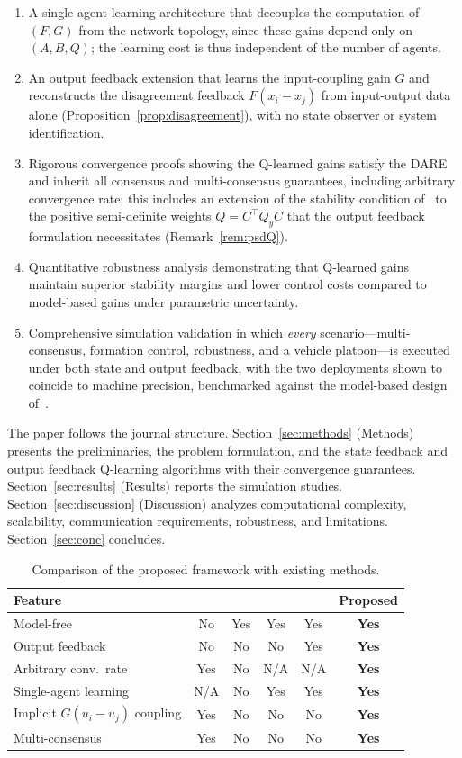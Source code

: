 \documentclass[12pt]{elsarticle}
\theoremstyle{remark}
\begin{document}
\begin{enumerate}
    \item[(i)] A single-agent learning architecture that decouples the computation of $(F,G)$ from the network topology, since these gains depend only on $(A,B,Q)$; the learning cost is thus independent of the number of agents.
    \item[(ii)] An output feedback extension that learns the input-coupling gain $G$ and reconstructs the disagreement feedback $F(x_i-x_j)$ from input-output data alone (Proposition~\ref{prop:disagreement}), with no state observer or system identification.
    \item[(iii)] Rigorous convergence proofs showing the Q-learned gains satisfy the DARE and inherit all consensus and multi-consensus guarantees, including arbitrary convergence rate; this includes an extension of the stability condition of~\cite{cacace2024} to the positive semi-definite weights $Q = C^\top Q_y C$ that the output feedback formulation necessitates (Remark~\ref{rem:psdQ}).
    \item[(iv)] Quantitative robustness analysis demonstrating that Q-learned gains maintain superior stability margins and lower control costs compared to model-based gains under parametric uncertainty.
    \item[(v)] Comprehensive simulation validation in which \emph{every} scenario---multi-consensus, formation control, robustness, and a vehicle platoon---is executed under both state and output feedback, with the two deployments shown to coincide to machine precision, benchmarked against the model-based design of~\cite{cacace2024}.
\end{enumerate}
The paper follows the journal structure. Section~\ref{sec:methods} (Methods) presents the preliminaries, the problem formulation, and the state feedback and output feedback Q-learning algorithms with their convergence guarantees. Section~\ref{sec:results} (Results) reports the simulation studies. Section~\ref{sec:discussion} (Discussion) analyzes computational complexity, scalability, communication requirements, robustness, and limitations. Section~\ref{sec:conc} concludes.
\begin{table}[htbp]
\centering
\caption{Comparison of the proposed framework with existing methods.}
\label{tab:comparison}
\small
\setlength{\tabcolsep}{4.5pt}
\begin{tabular}{lccccc}
\toprule
Feature & \cite{cacace2024} & \cite{zhang2011} & \cite{bradtke1994} & \cite{rizvi2022} & \textbf{Proposed} \\
\midrule
Model-free & No & Yes & Yes & Yes & \textbf{Yes} \\
Output feedback & No & No & No & Yes & \textbf{Yes} \\
Arbitrary conv.\ rate & Yes & No & N/A & N/A & \textbf{Yes} \\
Single-agent learning & N/A & No & Yes & Yes & \textbf{Yes} \\
Implicit $G(u_i{-}u_j)$ coupling & Yes & No & No & No & \textbf{Yes} \\
Multi-consensus & Yes & No & No & No & \textbf{Yes} \\
\bottomrule
\end{tabular}
\end{table}
\end{document}
